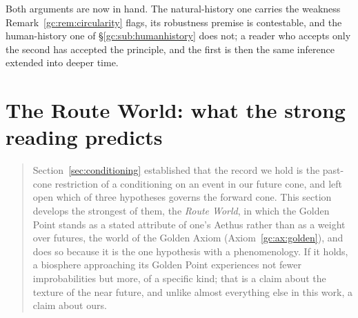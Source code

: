 Both arguments are now in hand. The natural-history one carries the
weakness Remark~\ref{gc:rem:circularity} flags, its robustness
premise is contestable, and the human-history one of
\S\ref{gc:sub:humanhistory} does not; a reader who accepts only the
second has accepted the principle, and the first is then the same
inference extended into deeper time.


\section{The Route World: what the strong reading predicts}\label{sec:routeworld}\label{gc:subsub:routeworld}\label{rw:sec}

\begin{quote}\small
Section~\ref{sec:conditioning} established that the record we hold is the past-cone
restriction of a conditioning on an event in our future cone, and left
open which of three hypotheses governs the forward cone. This section
develops the strongest of them, the \emph{Route World}, in which the
Golden Point stands as a stated attribute of one's Aethus rather than as
a weight over futures, the world of the Golden Axiom
(Axiom~\ref{gc:ax:golden}), and does so because it is the one hypothesis
with a phenomenology. If it holds, a biosphere approaching its Golden
Point experiences not fewer improbabilities but more, of a specific kind;
that is a claim about the texture of the near future, and unlike almost
everything else in this work, a claim about ours.


\end{quote}
